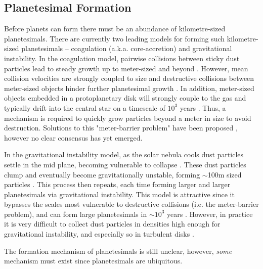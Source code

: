 \subsection{Planetesimal Formation}
Before planets can form there must be an abundance of kilometre-sized planetesimals.
There are currently two leading models for forming such kilometre-sized planetesimals -- coagulation (a.k.a. core-accretion) and gravitational instability. 
In the coagulation model, pairwise collisions between sticky dust particles lead to steady growth up to meter-sized and beyond \citep{Weidenschilling1977b, Armitage2010}.
However, mean collision velocities are strongly coupled to size and destructive collisions between meter-sized objects hinder further planetesimal growth \citep{Weidenschilling1977b, Blum2008}. 
In addition, meter-sized objects embedded in a protoplanetary disk will strongly couple to the gas and typically drift into the central star on a timescale of $10^3$ years \citep{Weidenschilling1977b}.
Thus, a mechanism is required to quickly grow particles beyond a meter in size to avoid destruction. 
Solutions to this "meter-barrier problem" have been proposed \citep[e.g.][]{Boley2014}, however no clear consensus has yet emerged.  

In the gravitational instability model, as the solar nebula cools dust particles settle in the mid plane, becoming vulnerable to collapse \citep{Goldreich1973}.
These dust particles clump and eventually become gravitationally unstable, forming $\sim$100m sized particles \citep{Goldreich1973}. 
This process then repeats, each time forming larger and larger planetesimals via gravitational instability.
This model is attractive since it bypasses the scales most vulnerable to destructive collisions (i.e. the meter-barrier problem), and can form large planetesimals in $\sim 10^3$ years \citep{Goldreich1973, Armitage2007}.
However, in practice it is very difficult to collect dust particles in densities high enough for gravitational instability, and especially so in turbulent disks \citep{Armitage2007}.
 
The formation mechanism of planetesimals is still unclear, however, \textit{some} mechanism must exist since planetesimals are ubiquitous. 

